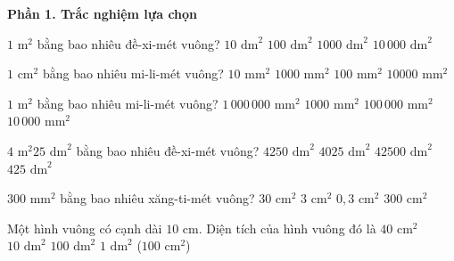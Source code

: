 \textbf{Phần 1. Trắc nghiệm lựa chọn}

\begin{ex} %
$1\text{ m}^2$ bằng bao nhiêu đề-xi-mét vuông?
\choice
{$10\text{ dm}^2$}
{\True $100\text{ dm}^2$}
{$1000\text{ dm}^2$}
{$10\,000\text{ dm}^2$}
\end{ex}

\begin{ex} %
$1\text{ cm}^2$ bằng bao nhiêu mi-li-mét vuông?
\choice
{$10\text{ mm}^2$}
{$1000\text{ mm}^2$}
{\True $100\text{ mm}^2$}
{$10000\text{ mm}^2$}
\end{ex}

\begin{ex} %
$1\text{ m}^2$ bằng bao nhiêu mi-li-mét vuông?
\choice
{\True $1\,000\,000\text{ mm}^2$}
{$1000\text{ mm}^2$}
{$100\,000\text{ mm}^2$}
{$10\,000\text{ mm}^2$}
\end{ex}

\begin{ex} %
$4\text{ m}^2 25\text{ dm}^2$ bằng bao nhiêu đề-xi-mét vuông?
\choice
{$4250\text{ dm}^2$}
{$4025\text{ dm}^2$}
{$42500\text{ dm}^2$}
{\True $425\text{ dm}^2$}
\end{ex}

\begin{ex} %
$300\text{ mm}^2$ bằng bao nhiêu xăng-ti-mét vuông?
\choice
{$30\text{ cm}^2$}
{\True $3\text{ cm}^2$}
{$0{,}3\text{ cm}^2$}
{$300\text{ cm}^2$}
\end{ex}

\begin{ex} %
Một hình vuông có cạnh dài $10\text{ cm}$. Diện tích của hình vuông đó là
\choice
{$40\text{ cm}^2$}
{$10\text{ dm}^2$}
{$100\text{ dm}^2$}
{\True $1\text{ dm}^2$ ($100\text{ cm}^2$)}
\end{ex}

